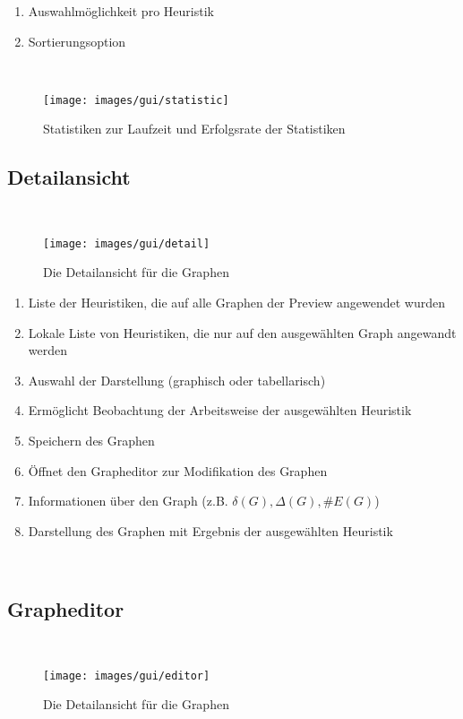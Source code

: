 \documentclass{article}
\begin{document}
	\begin{enumerate}[(1)]
		\item{Auswahlmöglichkeit pro Heuristik}
		\item{Sortierungsoption}
	\end{enumerate}
	
	~\begin{figure}[!h]
		\centering
		\texttt{[image: images/gui/statistic]}
		\caption{Statistiken zur Laufzeit und Erfolgsrate der Statistiken}
	\end{figure}
	
	
	
	\subsection{Detailansicht}
	~\begin{figure}[!h]
		\centering
		\texttt{[image: images/gui/detail]}
		\caption{Die Detailansicht für die Graphen}
	\end{figure}
	
	\FloatBarrier
	
	\begin{enumerate}[(1)]
		\item{Liste der Heuristiken, die auf alle Graphen der Preview angewendet wurden}
		\item{Lokale Liste von Heuristiken, die nur auf den ausgewählten Graph angewandt werden}
		\item{Auswahl der Darstellung (graphisch oder tabellarisch)}
		\item{Ermöglicht Beobachtung der Arbeitsweise der ausgewählten Heuristik}
		\item{Speichern des Graphen}
		\item{Öffnet den Grapheditor zur Modifikation des Graphen}
		\item{Informationen über den Graph (z.B. $\delta (G), \Delta (G), \# E(G)$)}
		\item{Darstellung des Graphen mit Ergebnis der ausgewählten Heuristik}
	\end{enumerate}
	
	
	
	
	~\newpage
	\subsection{Grapheditor}
	~\begin{figure}[!h]
		\centering
		\texttt{[image: images/gui/editor]}
		\caption{Die Detailansicht für die Graphen}
	\end{figure}
	
\end{document}
